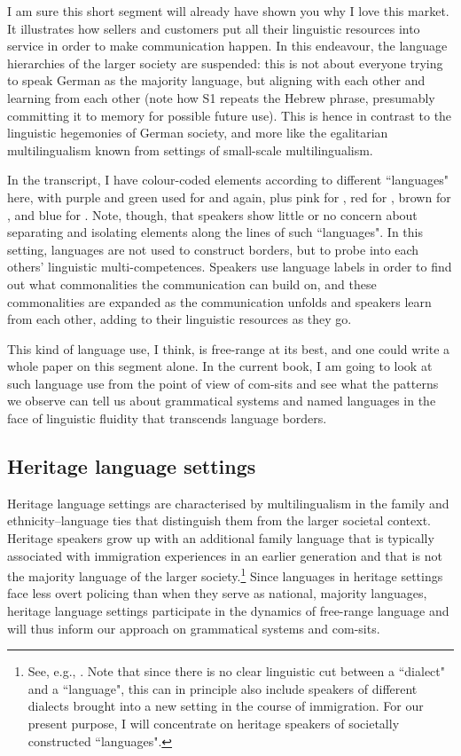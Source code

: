 I am sure this short segment will already have shown you why I love this market. It illustrates how sellers and customers put all their linguistic resources into service in order to make communication happen. In this endeavour, the language hierarchies of the larger society are suspended: this is not about everyone trying to speak German as the majority language, but aligning with each other and learning from each other (note how S1 repeats the Hebrew phrase, presumably committing it to memory for possible future use). This is hence in contrast to the linguistic hegemonies of German society, and more like the egalitarian multilingualism known from settings of small-scale multilingualism.

In the transcript, I have colour-coded elements according to different “languages" here, with purple and green used for  and  again, plus pink for , red for , brown for , and blue for . Note, though, that speakers show little or no concern about separating and isolating elements along the lines of such “languages". In this setting, languages are not used to construct borders, but to probe into each others’ linguistic multi-competences. Speakers use language labels in order to find out what commonalities the communication can build on, and these commonalities are expanded as the communication unfolds and speakers learn from each other, adding to their linguistic resources as they go.

This kind of language use, I think, is free-range at its best, and one could write a whole paper on this segment alone. In the current book, I am going to look at such language use from the point of view of com-sits and see what the patterns we observe can tell us about grammatical systems and named languages in the face of linguistic fluidity that transcends language borders.

\subsection{Heritage language settings}
\hypertarget{Toc125444654}{}
Heritage language settings are characterised by multilingualism in the family  and eth\-nic\-ity--language ties that distinguish them from the larger societal context. Heritage speakers grow up with an additional family language that is typically associated with immigration experiences in an earlier generation and that is not the majority language of the larger society.\footnote{See, e.g., \citet{MontrulPolinsky2019}. Note that since there is no clear linguistic cut between a “dialect" and a “language", this can in principle also include speakers of different dialects brought into a new setting in the course of immigration. For our present purpose, I will concentrate on heritage speakers of societally constructed “languages".} Since languages in heritage settings face less overt policing than when they serve as national, majority languages, heritage language settings participate in the dynamics of free-range language and will thus inform our approach on grammatical systems and com-sits.

